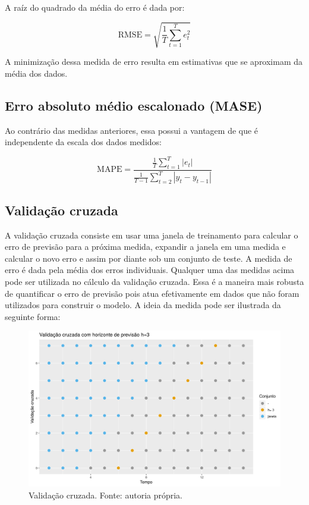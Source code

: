 \documentclass[
	12pt,				%
	openright,			%
	oneside,			%
	a4paper,			%
	english,			%
	french,				%
	spanish,			%
	brazil				%
	]{abntex2}
\begin{document}
A raíz do quadrado da média do erro é dada por:

$$\text{RMSE} = \sqrt{\frac{1}{T}\sum_{t=1}^{T}e_{t}^2}$$

A minimização dessa medida de erro resulta em estimativas que se aproximam da média dos dados.

\subsection{Erro absoluto médio escalonado (MASE)}

Ao contrário das medidas anteriores, essa possui a vantagem de que é independente da escala dos dados medidos:

$$\text{MAPE} = \frac{\frac{1}{T}\sum_{t=1}^T\left|e_t\right|}{\frac{1}{T-1}\sum_{t=2}^{T}\left|y_t-y_{t-1}\right|}$$

\subsection{Validação cruzada}\label{cruzada}

A validação cruzada consiste em usar uma janela de treinamento para calcular o erro de previsão para a próxima medida, expandir a janela em uma medida e calcular o novo erro e assim por diante sob um conjunto de teste. A medida de erro é dada pela média dos erros individuais. Qualquer uma das medidas acima pode ser utilizada no cálculo da validação cruzada. Essa é a maneira mais robusta de quantificar o erro de previsão pois atua efetivamente em dados que não foram utilizados para construir o modelo. A ideia da medida pode ser ilustrada da seguinte forma:

\begin{figure}[h]
    \centering
	\includegraphics[width=\textwidth]{crossh3}
	\caption{Validação cruzada. Fonte: autoria própria.}
\end{figure}
\FloatBarrier
\end{document}
